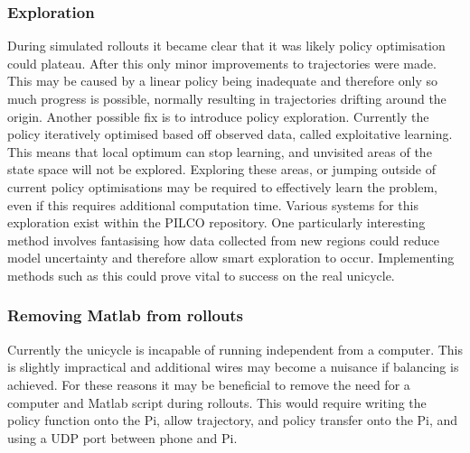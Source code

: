 \documentclass[twoside,twocolumn,12pt]{article}
\begin{document}
\subsubsection{Exploration}
During simulated rollouts it became clear that it was likely policy optimisation could plateau. After this only minor improvements to trajectories were made. This may be caused by a linear policy being inadequate and therefore only so much progress is possible, normally resulting in trajectories drifting around the origin.
\newline
Another possible fix is to introduce policy exploration. Currently the policy iteratively optimised based off observed data, called exploitative learning. This means that local optimum can stop learning, and unvisited areas of the state space will not be explored. Exploring these areas, or jumping outside of current policy optimisations may be required to effectively learn the problem, even if this requires additional computation time. 
\newline
Various systems for this exploration exist within the PILCO repository. One particularly interesting method involves fantasising how data collected from new regions could reduce model uncertainty and therefore allow smart exploration to occur. \cite{exp}
\newline
Implementing methods such as this could prove vital to success on the real unicycle.
\subsubsection{Removing Matlab from rollouts}
Currently the unicycle is incapable of running independent from a computer. This is slightly impractical and additional wires may become a nuisance if balancing is achieved. For these reasons it may be beneficial to remove the need for a computer and Matlab script during rollouts. This would require writing the policy function onto the Pi, allow trajectory, and policy transfer onto the Pi, and using a UDP port between phone and Pi.
\end{document}
